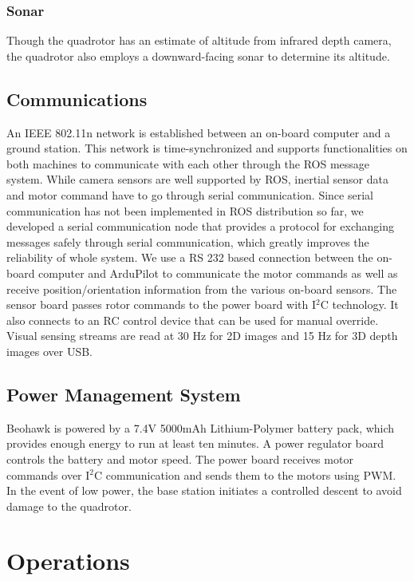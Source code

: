 \documentclass[12pt, letterpaper]{article}
\begin{document}
\subsubsection{Sonar}

Though the quadrotor has an estimate of altitude from infrared depth camera, the quadrotor also employs a downward-facing sonar to determine its altitude.

\subsection{Communications}

An IEEE 802.11n network is established between an on-board computer and a ground station. This network is time-synchronized and supports functionalities on both machines to communicate with each other through the ROS message system. While camera sensors are well supported by ROS, inertial sensor data and motor command have to go through serial communication. Since serial communication has not been implemented in ROS distribution so far, we developed a serial communication node that provides a protocol for exchanging messages safely through serial communication, which greatly improves the reliability of whole system. We use a RS 232 based connection between the on-board computer and ArduPilot to communicate the motor commands as well as receive position/orientation information from the various on-board sensors. The sensor board passes rotor commands to the power board with I$^2$C technology. It also connects to an RC control device that can be used for manual override. Visual sensing streams are read at 30 Hz for 2D images and 15 Hz for 3D depth images over USB.

\subsection{Power Management System}

Beohawk is powered by a 7.4V 5000mAh Lithium-Polymer battery pack, which provides enough energy to run at least ten minutes. A power regulator board controls the battery and motor speed. The power board receives motor commands over I$^2$C communication and sends them to the motors using PWM. In the event of low power, the base station initiates a controlled descent to avoid damage to the quadrotor.

\section{Operations}
\end{document}
